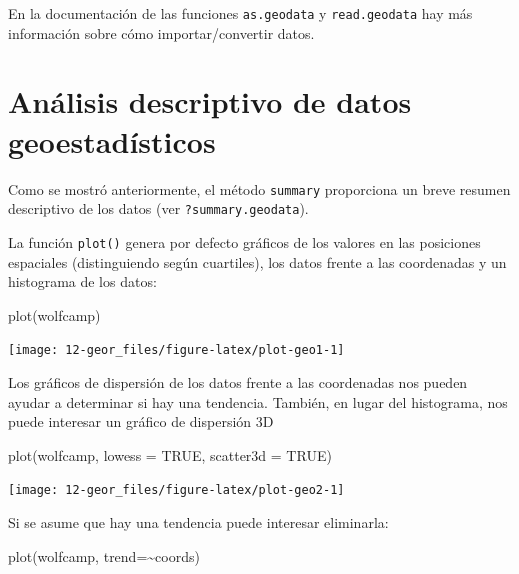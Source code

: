 \documentclass[
  spanish,
]{book}
\newenvironment{Shaded}{\begin{snugshade}}{\end{snugshade}}
\newcommand{\AttributeTok}[1]{\textcolor[rgb]{0.77,0.63,0.00}{#1}}
\newcommand{\ConstantTok}[1]{\textcolor[rgb]{0.00,0.00,0.00}{#1}}
\newcommand{\FunctionTok}[1]{\textcolor[rgb]{0.00,0.00,0.00}{#1}}
\newcommand{\NormalTok}[1]{#1}
\newcommand{\SpecialCharTok}[1]{\textcolor[rgb]{0.00,0.00,0.00}{#1}}
\theoremstyle{break}
\theoremstyle{definition}
\theoremstyle{definition}
\theoremstyle{definition}
\theoremstyle{definition}
\theoremstyle{remark}
\begin{document}
En la documentación de las funciones \texttt{as.geodata} y \texttt{read.geodata}
hay más información sobre cómo importar/convertir datos.

\hypertarget{anuxe1lisis-descriptivo-de-datos-geoestaduxedsticos}{%
\section{Análisis descriptivo de datos geoestadísticos}\label{anuxe1lisis-descriptivo-de-datos-geoestaduxedsticos}}

Como se mostró anteriormente, el método \texttt{summary} proporciona un breve resumen
descriptivo de los datos (ver \texttt{?summary.geodata}).

La función \texttt{plot()} genera por defecto gráficos de los
valores en las posiciones espaciales (distinguiendo según cuartiles),
los datos frente a las coordenadas y un histograma de los datos:

\begin{Shaded}
\begin{Highlighting}[]
\FunctionTok{plot}\NormalTok{(wolfcamp)}
\end{Highlighting}
\end{Shaded}

\begin{center}\texttt{[image: 12-geor\_files/figure-latex/plot-geo1-1]} \end{center}

Los gráficos de dispersión de los datos frente a las coordenadas nos pueden ayudar
a determinar si hay una tendencia. También, en lugar del histograma,
nos puede interesar un gráfico de dispersión 3D

\begin{Shaded}
\begin{Highlighting}[]
\FunctionTok{plot}\NormalTok{(wolfcamp, }\AttributeTok{lowess =} \ConstantTok{TRUE}\NormalTok{, }\AttributeTok{scatter3d =} \ConstantTok{TRUE}\NormalTok{) }
\end{Highlighting}
\end{Shaded}

\begin{center}\texttt{[image: 12-geor\_files/figure-latex/plot-geo2-1]} \end{center}

Si se asume que hay una tendencia puede interesar eliminarla:

\begin{Shaded}
\begin{Highlighting}[]
\FunctionTok{plot}\NormalTok{(wolfcamp, }\AttributeTok{trend=}\SpecialCharTok{\textasciitilde{}}\NormalTok{coords)}
\end{Highlighting}
\end{Shaded}
\end{document}
